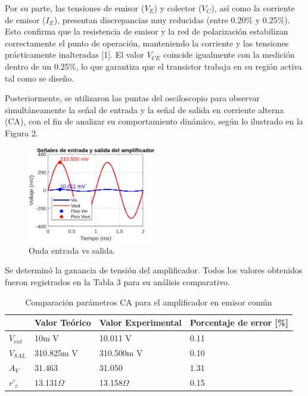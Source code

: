 \documentclass[journal]{IEEEtran}
\begin{document}
\par Por su parte, las tensiones de emisor (\( V_E \)) y colector (\( V_C \)), así como la corriente de emisor (\( I_E \)), presentan discrepancias muy reducidas (entre 0.20\% y 0.25\%). Esto confirma que la resistencia de emisor y la red de polarización estabilizan correctamente el punto de operación, manteniendo la corriente y las tensiones prácticamente inalteradas [1]. El valor \( V_{CE} \) coincide igualmente con la medición dentro de un 0.25\%, lo que garantiza que el transistor trabaja en su región activa tal como se diseño.
\par Posteriormente, se utilizaron las puntas del osciloscopio para observar simultáneamente la señal de entrada y la señal de salida en corriente alterna (CA), con el fin de analizar su comportamiento dinámico, según lo ilustrado en la Figura 2. 
\begin{figure}[H]
    \centering
    \includegraphics[width=0.5\textwidth]{onda_entrada_salida.png}
    \caption{Onda entrada vs salida.}
    \label{fig:onda_entrada_salida.}
\end{figure}
\par Se determinó la ganancia de tensión del amplificador. Todos los valores obtenidos fueron registrados en la Tabla 3 para su análisis comparativo.
\begin{table}[h]
    \caption{Comparación parámetros CA para el amplificador en emisor común}
    \centering
    \renewcommand{\arraystretch}{1.2} %
    \begin{tabular}{|l|p{2cm}|p{2cm}|p{2cm}|}
        \hline
        & \textbf{Valor Teórico} & \textbf{Valor Experimental} & \textbf{Porcentaje de error [\%]} \\
        \hline
        \( V_{ent}\) & 10m V   & 10.011 V  & 0.11 \\
        \hline
        \( V_{SAL} \) & 310.825m V    & 310.500m V  & 0.10 \\
        \hline
        \( A_V \) & 31.463 & 31.050 & 1.31 \\
        \hline
        \( r'_e \) & 13.131$\Omega$ & 13.158$\Omega$ & 0.15 \\
        \hline
    \end{tabular}
    \label{tab:parámetrosCA}
\end{table}
\end{document}
